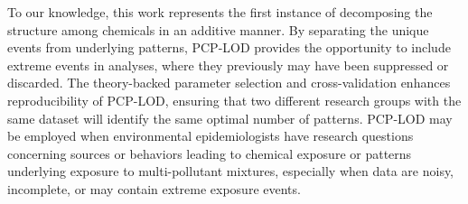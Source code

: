 To our knowledge, this work represents the first instance of decomposing the structure among chemicals in an additive manner. By separating the unique events from underlying patterns, PCP-LOD provides the opportunity to include extreme events in analyses, where they previously may have been suppressed or discarded. The theory-backed parameter selection and cross-validation enhances reproducibility of PCP-LOD, ensuring that two different research groups with the same dataset will identify the same optimal number of patterns. PCP-LOD may be employed when environmental epidemiologists have research questions concerning sources or behaviors leading to chemical exposure or patterns underlying exposure to multi-pollutant mixtures, especially when data are noisy, incomplete, or may contain extreme exposure events.

{\setcounter{figure}{0} %
\setcounter{table}{0}
\renewcommand{\thefigure}{2.S.\arabic{figure}}
\renewcommand{\thetable}{2.S.\arabic{table}}
\clearpage
}
